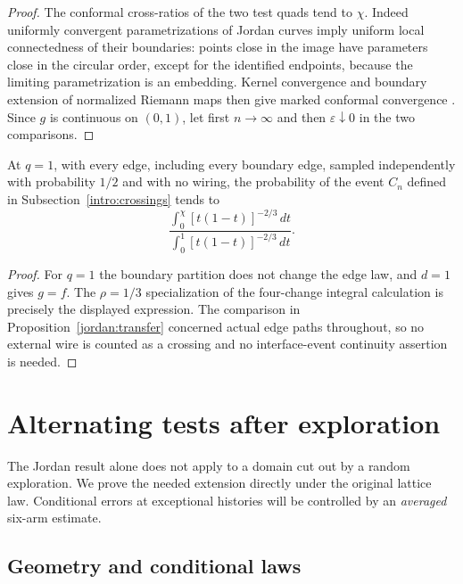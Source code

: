 \begin{proof}
The conformal cross-ratios of the two test quads tend to $\chi$.
Indeed uniformly convergent parametrizations of Jordan curves imply
uniform local connectedness of their boundaries: points close in the
image have parameters close in the circular order, except for the
identified endpoints, because the limiting parametrization is an
embedding.  Kernel convergence and boundary extension of normalized
Riemann maps then give marked conformal convergence
\cite{Pommerenke1992}.  Since $g$ is continuous on $(0,1)$, let first
$n\to\infty$ and then $\varepsilon\downarrow0$ in the two comparisons.
\end{proof}

\begin{corollary}\label{jordan:cardy}
At $q=1$, with every edge, including every boundary edge, sampled
independently with probability $1/2$ and with no wiring, the probability
of the event $C_n$ defined in Subsection~\ref{intro:crossings} tends to
\[
 \frac{\displaystyle\int_0^\chi [t(1-t)]^{-2/3}\,dt}
      {\displaystyle\int_0^1 [t(1-t)]^{-2/3}\,dt}.
\]
\end{corollary}
\begin{proof}
For $q=1$ the boundary partition does not change the edge law, and
$d=1$ gives $g=f$.  The $\rho=1/3$ specialization of the four-change
integral calculation is precisely the displayed expression.  The
comparison in Proposition~\ref{jordan:transfer} concerned actual edge
paths throughout, so no external wire is counted as a crossing and
no interface-event continuity assertion is needed.
\end{proof}

\section{Alternating tests after exploration}\label{sec:movingtests}

The Jordan result alone does not apply to a domain cut out by a random
exploration.  We prove the needed extension directly under the
original lattice law.  Conditional errors at exceptional histories
will be controlled by an \emph{averaged} six-arm estimate.

\subsection{Geometry and conditional laws}

